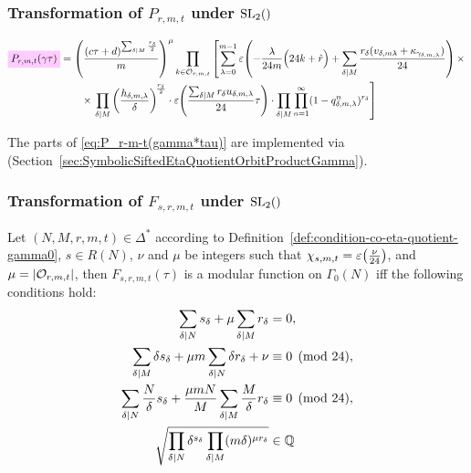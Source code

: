 \documentclass{article}
\begin{document}
\subsubsection{Transformation of $P_{r,m,t}$ under $\SL2Z$}

\begin{align}
  \defineNotation[P-r-m-t-gamma-tau]{P_{r,m,t}(\gamma\tau)}
  &=
    \left(\frac{(c\tau+d)^{\divisorsum{M} \frac{r_\delta}{2}}}{m}\right)^\mu
    \prod_{k\in \modularOrbit{r,m,t}}
    \left[\sum_{\lambda=0}^{m-1}
    \unityPower{-\frac{\lambda}{24m}\Bigl(24k+\sumdelta{r}\Bigr)
    + \divisorsum{M}\frac{r_\delta(v_{\delta,m\lambda} +
    \kappa_{\gamma_{\delta,m,\lambda}})}{24}} \times\right.\notag\\
  &\qquad\times
    \left.
    \divisorprod{M}
    \left(\frac{h_{\delta,m,\lambda}}{\delta}\right)^{\!\frac{r_\delta}{2}}
    \cdot
    \unityPower{\frac{\divisorsum{M} r_\delta u_{\delta,m,\lambda}}{24}\tau}
    \cdot
    \divisorprod{M} \prod_{n=1}^\infty (1-q_{\delta,m,\lambda}^n)^{r_\delta}
    \right]
    \label{eq:P_r-m-t(gamma*tau)}
\end{align}

The parts of \eqref{eq:P_r-m-t(gamma*tau)} are implemented via
\textcolor{blue}{}
(Section~\ref{sec:SymbolicSiftedEtaQuotientOrbitProductGamma}).

\subsubsection{Transformation of $F_{s,r,m,t}$ under $\SL2Z$}

\begin{Theorem}\cite[Thm.~45]{Radu:RamanujanKolberg:2015}
  \label{thm:RaduConditions}
  Let $(N, M, r, m, t) \in \Delta^*$ according to
  Definition~\ref{def:condition-co-eta-quotient-gamma0}, $s\in R(N)$,
  $\nu$ and $\mu$ be integers such that
  $\chi_{s,m,t}=\varepsilon\!\left(\frac{\nu}{24}\right)$, and
  $\mu=\lvert\mathcal{O}_{r,m,t}\rvert$, then $F_{s,r,m,t}(\tau)$ is
  a modular function on $\Gamma_0(N)$ iff the following conditions
  hold:
  \begin{align}
    \sum_{\delta \mid N} s_\delta + \mu \sum_{\delta \mid M} r_\delta
    &=
      0,
    \label{eq:Radu-sum=0}\\
    \sum_{\delta \mid M} \delta s_\delta + \mu m \sum_{\delta \mid N} \delta r_\delta + \nu
    &\equiv
      0 \pmod{24},
    \label{eq:Radu-sigmainfinity}\\
    \sum_{\delta \mid N} \frac{N}{\delta} s_\delta
    + \frac{\mu m N}{M} \sum_{\delta \mid M} \frac{M}{\delta} r_\delta
    &\equiv
      0 \pmod{24},
    \label{eq:Radu-sigma0}\\
    \sqrt{
    \prod_{\delta \mid N}\delta^{s_\delta}
    \prod_{\delta \mid M} (m \delta)^{\mu r_\delta}
    } &\in \mathbb{Q}\label{eq:Radu-productsquare}
  \end{align}
\end{Theorem}
\end{document}
